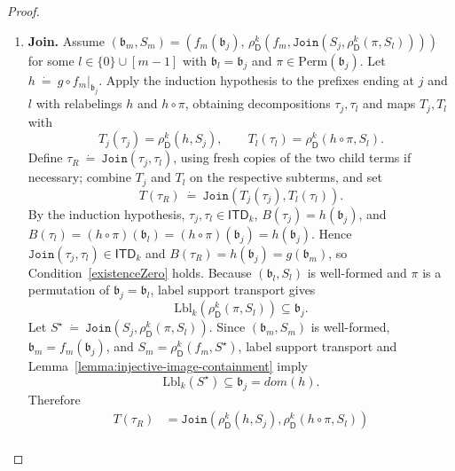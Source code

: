 \documentclass[10pt,a4paper]{amsart}
\newcommand{\abag}{\mathfrak{b}}
\newcommand{\abstractdecomposition}{\tau}
\newcommand{\action}{\rho}
\newcommand{\allabstractdecompositionstreewidth}[1]{\mathsf{ITD}_{#1}}
\newcommand{\defeq}{~\dot{=}~}
\newcommand{\domain}{dom}
\newcommand{\dpcore}{\mathsf{D}}
\newcommand{\dprefutation}{R}
\newcommand{\jointype}{\mathtt{Join}}
\newcommand{\relabelingfunction}{f}
\newcommand{\subtermToBag}{T}
\newcommand{\topbag}[1]{\topbagname(#1)}
\newcommand{\topbagname}{B}
\newcommand{\treewidthvalue}{k}
\newcommand{\witnessset}{S}
\begin{document}
\begin{proof}
\begin{enumerate}
\item \textbf{Join.}
Assume $(\abag_m,\witnessset_m)=(\relabelingfunction_m(\abag_j),\,\action_{\dpcore}^{\treewidthvalue}(\relabelingfunction_m,\jointype(\witnessset_j,\action_{\dpcore}^{\treewidthvalue}(\pi,\witnessset_l))))$ for some $l\in \{0\}\cup[m-1]$ with $\abag_l=\abag_j$ and $\pi\in\mathrm{Perm}(\abag_j)$.
Let $h\defeq g\circ \relabelingfunction_m|_{\abag_j}$.
Apply the induction hypothesis to the prefixes ending at $j$ and $l$ with relabelings $h$ and $h\circ \pi$, obtaining decompositions $\abstractdecomposition_j,\abstractdecomposition_l$ and maps $\subtermToBag_j,\subtermToBag_l$ with
\[
\subtermToBag_j(\abstractdecomposition_j)=\action_{\dpcore}^{\treewidthvalue}(h,\witnessset_j),
\qquad
\subtermToBag_l(\abstractdecomposition_l)=\action_{\dpcore}^{\treewidthvalue}(h\circ \pi,\witnessset_l).
\]
Define $\abstractdecomposition_{\dprefutation}\defeq \jointype(\abstractdecomposition_j,\abstractdecomposition_l)$, using fresh copies of the two child terms if necessary; combine $\subtermToBag_j$ and $\subtermToBag_l$ on the respective subterms, and set
\[
\subtermToBag(\abstractdecomposition_{\dprefutation}) \defeq \jointype(\subtermToBag_j(\abstractdecomposition_j),\subtermToBag_l(\abstractdecomposition_l)).
\]
By the induction hypothesis, $\abstractdecomposition_j,\abstractdecomposition_l\in \allabstractdecompositionstreewidth{\treewidthvalue}$, $\topbag{\abstractdecomposition_j}=h(\abag_j)$, and $\topbag{\abstractdecomposition_l}=(h\circ \pi)(\abag_l)=(h\circ \pi)(\abag_j)=h(\abag_j)$.
Hence $\jointype(\abstractdecomposition_j,\abstractdecomposition_l)\in \allabstractdecompositionstreewidth{\treewidthvalue}$ and $\topbag{\abstractdecomposition_{\dprefutation}}=h(\abag_j)=g(\abag_m)$, so Condition~\ref{existenceZero} holds.
Because $(\abag_l,\witnessset_l)$ is well-formed and $\pi$ is a permutation of $\abag_j=\abag_l$, label support transport gives
\[
\mathrm{Lbl}_{\treewidthvalue}(\action_{\dpcore}^{\treewidthvalue}(\pi,\witnessset_l))\subseteq \abag_j.
\]
Let $S^\star\defeq \jointype(\witnessset_j,\action_{\dpcore}^{\treewidthvalue}(\pi,\witnessset_l))$.
Since $(\abag_m,\witnessset_m)$ is well-formed, $\abag_m=\relabelingfunction_m(\abag_j)$, and $\witnessset_m=\action_{\dpcore}^{\treewidthvalue}(\relabelingfunction_m,S^\star)$, label support transport and Lemma~\ref{lemma:injective-image-containment} imply
\[
\mathrm{Lbl}_{\treewidthvalue}(S^\star)\subseteq \abag_j=\domain(h).
\]
Therefore
\[
\begin{aligned}
\subtermToBag(\abstractdecomposition_{\dprefutation})
&= \jointype(\action_{\dpcore}^{\treewidthvalue}(h,\witnessset_j),\action_{\dpcore}^{\treewidthvalue}(h\circ \pi,\witnessset_l))\\

\end{aligned}\]
\end{enumerate}
\end{proof}
\end{document}
